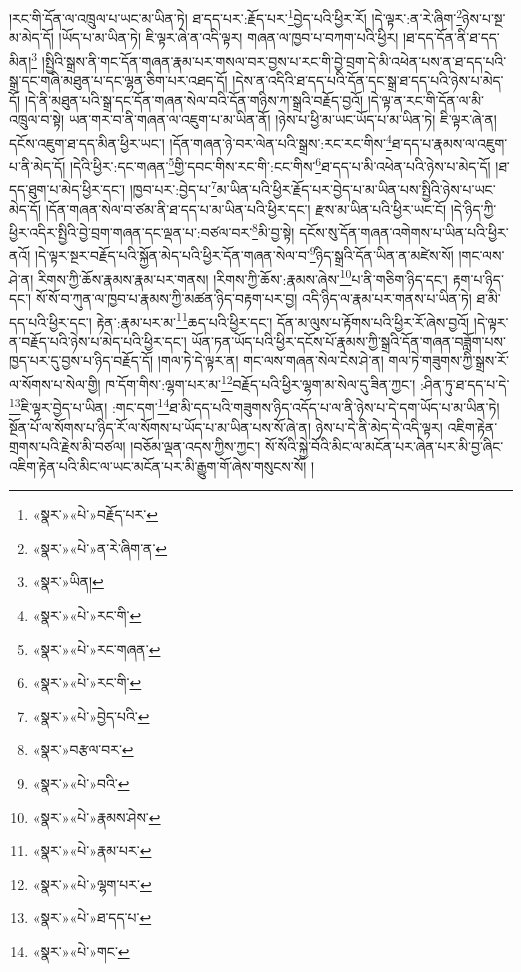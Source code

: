 །རང་གི་དོན་ལ་འཁྲུལ་པ་ཡང་མ་ཡིན་ཏེ། ཐ་དད་པར་:རྗོད་པར་\footnote{«སྣར་»«པེ་»བརྗོད་པར་}བྱེད་པའི་ཕྱིར་རོ། །དེ་ལྟར་:ན་རེ་ཞིག་\footnote{«སྣར་»«པེ་»ན་རེ་ཞིག་ན་}ཉེས་པ་སྔ་མ་མེད་དོ། །ཡོད་པ་མ་ཡིན་ཏེ། ཇི་ལྟར་ཞེ་ན་འདི་ལྟར། གཞན་ལ་ཁྱབ་པ་བཀག་པའི་ཕྱིར། །ཐ་དད་དོན་ནི་ཐ་དད་མིན།\footnote{«སྣར་»ཡིན།} །སྤྱིའི་སྒྲས་ནི་གང་དོན་གཞན་རྣམ་པར་གསལ་བར་བྱས་པ་རང་གི་བྱེ་བྲག་དེ་མི་འཕེན་པས་ན་ཐ་དད་པའི་སྒྲ་དང་གཞི་མཐུན་པ་དང་ལྷན་ཅིག་པར་འཐད་དོ། །དེས་ན་འདིའི་ཐ་དད་པའི་དོན་དང་སྒྲ་ཐ་དད་པའི་ཉེས་པ་མེད་དོ། །དེ་ནི་མཐུན་པའི་སྒྲ་དང་དོན་གཞན་སེལ་བའི་དོན་གཉིས་ཀ་སྒྲའི་བརྗོད་བྱའོ། །དེ་ལྟ་ན་རང་གི་དོན་ལ་མི་འཁྲུལ་བ་སྟེ། ཡན་གར་བ་ནི་གཞན་ལ་འཇུག་པ་མ་ཡིན་ནོ། །ཉེས་པ་ཕྱི་མ་ཡང་ཡོད་པ་མ་ཡིན་ཏེ། ཇི་ལྟར་ཞེ་ན། དངོས་འཇུག་ཐ་དད་མིན་ཕྱིར་ཡང་། །དོན་གཞན་ཉེ་བར་ལེན་པའི་སྒྲས་:རང་རང་གིས་\footnote{«སྣར་»«པེ་»རང་གི་}ཐ་དད་པ་རྣམས་ལ་འཇུག་པ་ནི་མེད་དོ། །དེའི་ཕྱིར་:དང་གཞན་\footnote{«སྣར་»«པེ་»རང་གཞན་}གྱི་དབང་གིས་རང་གི་:ངང་གིས་\footnote{«སྣར་»«པེ་»རང་གི་}ཐ་དད་པ་མི་འཕེན་པའི་ཉེས་པ་མེད་དོ། །ཐ་དད་ཐུག་པ་མེད་ཕྱིར་དང་། །ཁྱབ་པར་:བྱེད་པ་\footnote{«སྣར་»«པེ་»བྱེད་པའི་}མ་ཡིན་པའི་ཕྱིར་རྗོད་པར་བྱེད་པ་མ་ཡིན་པས་སྤྱིའི་ཉེས་པ་ཡང་མེད་དོ། །དོན་གཞན་སེལ་བ་ཙམ་ནི་ཐ་དད་པ་མ་ཡིན་པའི་ཕྱིར་དང་། རྫས་མ་ཡིན་པའི་ཕྱིར་ཡང་ངོ། །དེ་ཉིད་ཀྱི་ཕྱིར་འདིར་སྤྱིའི་བྱེ་བྲག་གཞན་དང་ལྡན་པ་:བཙལ་བར་\footnote{«སྣར་»བརྩལ་བར་}མི་བྱ་སྟེ། དངོས་སུ་དོན་གཞན་འགེགས་པ་ཡིན་པའི་ཕྱིར་ནའོ། །དེ་ལྟར་སྔར་བརྗོད་པའི་སྐྱོན་མེད་པའི་ཕྱིར་དོན་གཞན་སེལ་བ་\footnote{«སྣར་»«པེ་»བའི་}ཉིད་སྒྲའི་དོན་ཡིན་ན་མཛེས་སོ། །གང་ལས་ཤེ་ན། རིགས་ཀྱི་ཆོས་རྣམས་རྣམ་པར་གནས། །རིགས་ཀྱི་ཆོས་:རྣམས་ཞེས་\footnote{«སྣར་»«པེ་»རྣམས་ཤེས་}པ་ནི་གཅིག་ཉིད་དང་། རྟག་པ་ཉིད་དང་། སོ་སོ་བ་ཀུན་ལ་ཁྱབ་པ་རྣམས་ཀྱི་མཚན་ཉིད་བརྟག་པར་བྱ། འདི་ཉིད་ལ་རྣམ་པར་གནས་པ་ཡིན་ཏེ། ཐ་མི་དད་པའི་ཕྱིར་དང་། རྟེན་:རྣམ་པར་མ་\footnote{«སྣར་»«པེ་»རྣམ་པར་}ཆད་པའི་ཕྱིར་དང་། དོན་མ་ལུས་པ་རྟོགས་པའི་ཕྱིར་རོ་ཞེས་བྱའོ། །དེ་ལྟར་ན་བརྗོད་པའི་ཉེས་པ་མེད་པའི་ཕྱིར་དང་། ཡོན་ཏན་ཡོད་པའི་ཕྱིར་དངོས་པོ་རྣམས་ཀྱི་སྒྲའི་དོན་གཞན་བཟློག་པས་ཁྱད་པར་དུ་བྱས་པ་ཉིད་བརྗོད་དོ། །གལ་ཏེ་དེ་ལྟར་ན། གང་ལས་གཞན་སེལ་ངེས་ཤེ་ན། གལ་ཏེ་གཟུགས་ཀྱི་སྒྲས་རོ་ལ་སོགས་པ་སེལ་གྱི། ཁ་དོག་གིས་:ལྷག་པར་མ་\footnote{«སྣར་»«པེ་»ལྷག་པར་}བརྗོད་པའི་ཕྱིར་ལྷག་མ་སེལ་དུ་ཟིན་ཀྱང་། :ཤིན་ཏུ་ཐ་དད་པ་དེ་\footnote{«སྣར་»«པེ་»ཐ་དད་པ་}ཇི་ལྟར་བྱེད་པ་ཡིན། :གང་དག་\footnote{«སྣར་»«པེ་»གང་}ཐ་མི་དད་པའི་གཟུགས་ཉིད་འདོད་པ་ལ་ནི་ཉེས་པ་དེ་དག་ཡོད་པ་མ་ཡིན་ཏེ། སྔོན་པོ་ལ་སོགས་པ་ཉིད་རོ་ལ་སོགས་པ་ཡོད་པ་མ་ཡིན་པས་སོ་ཞེ་ན། ཉེས་པ་དེ་ནི་མེད་དེ་འདི་ལྟར། འཇིག་རྟེན་གྲགས་པའི་རྗེས་མི་བཙལ། །བཅོམ་ལྡན་འདས་ཀྱིས་ཀྱང་། སོ་སོའི་སྐྱེ་བོའི་མིང་ལ་མངོན་པར་ཞེན་པར་མི་བྱ་ཞིང་འཇིག་རྟེན་པའི་མིང་ལ་ཡང་མངོན་པར་མི་རྒྱུག་གོ་ཞེས་གསུངས་སོ། །
